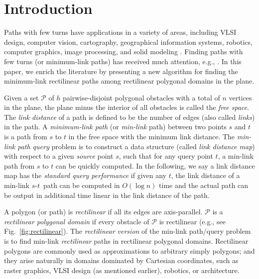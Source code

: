 \documentclass[english,runningheads,11pt]{llncs-revised}
\def\calP{\mathcal{P}}
\def\st{$s$-$t$}
\begin{document}
\section{Introduction}
\label{sec:intro}

Paths with few turns have applications in a variety of areas,
including VLSI design, computer vision,
cartography, geographical information systems, robotics, computer
graphics, image processing, and solid modeling
\cite{ref:ArkinLo95,ref:DjidjevAn92,ref:GuibasAp93,ref:KolarovOn91,ref:McMasterAu87,ref:NatarajanOn91,ref:ReifMi87,ref:SuriMi87,ref:TamassiaOn86}.
Finding paths with few turns (or
minimum-link paths) has received much attention, e.g.,
\cite{ref:AdegeestMi94,ref:ArkinLo95,ref:DasGe91,ref:deBergOn91,ref:deRezendeRe89,ref:ElGindyHi85,ref:GhoshCo91,ref:ImaiEf86,ref:LingasOp95,ref:MaheshwariLi00,ref:MitchellMi14,ref:MitchellMi92,ref:ReifMi87,ref:SchuiererAn96,ref:SuriA86,ref:SuriMi87,ref:SuriOn90}.
In this paper, we enrich the literature by presenting a new algorithm for
finding the minimum-link rectilinear paths among rectilinear polygonal
domains in the plane.


Given a set $\calP$ of $h$ pairwise-disjoint polygonal obstacles with
a total of $n$ vertices in the plane,
the plane minus the interior of all obstacles is called the {\em free space}.
The {\em link distance} of a
path is defined to be the number of edges (also called {\em links})
in the path. A {\em minimum-link path} (or {\em min-link} path)
between two points $s$ and $t$ is a path from $s$ to $t$ in the free space
with the minimum link distance.
The {\em min-link path query} problem is to construct a data structure (called
{\em link distance map}) with respect to a given {\em source} point
$s$, such that for any query point $t$, a min-link path from $s$
to $t$ can be quickly computed. In the following, we say a
link distance map has the {\em standard query performance} if given any
$t$, the link distance of a min-link \st\ path can be computed in
$O(\log n)$ time and the actual path can be output in additional time
linear in the link distance of the path.

A polygon (or path) is {\em rectilinear} if all its edges are
axis-parallel.  $\calP$ is a {\em rectilinear
polygonal domain} if every obstacle of $\calP$ is rectilinear
(e.g., see Fig.~\ref{fig:rectilinear}).
The {\em rectilinear version} of the min-link path/query problem is to
find min-link {\em rectilinear} paths in rectilinear polygonal domains.
Rectilinear polygons are commonly used as
approximations to arbitrary simply polygons; and they arise naturally
in domains dominated by Cartesian coordinates, such as raster
graphics, VLSI design (as mentioned earlier), robotics, or architecture.
\end{document}
